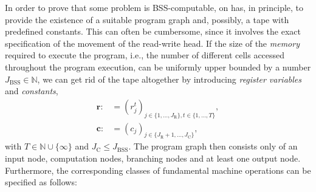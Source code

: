 \documentclass[conference]{IEEEtran}
\def\NN{{\mathbb N}}
\newcommand{\BSS}{\mathrm{BSS}}
\begin{document}
	In order to prove that some problem is BSS-computable, on has, in principle, to provide the existence of a suitable program graph and, possibly, a tape with predefined constants. 
	This can often be cumbersome, since it involves the exact specification of the movement of the read-write head. If the size of the \emph{memory} required to execute the program, i.e., 
	the number of different cells accessed throughout the program execution, can be uniformly upper bounded by a number \(J_\BSS \in \NN\), we can get rid of the tape altogether by 
	introducing \emph{register variables} and \emph{constants},
	\begin{align*}	\bm{r} :&= (r_j^t)_{j\in\{1,\ldots,J_{\mathrm{R}}\}, t\in\{1,\ldots,T\}},\\
					\bm{c} :&= (c_j)_{j\in\{J_{\mathrm{R}} + 1,\ldots,J_{\mathrm{C}}\}},
	\end{align*}
	with \(T\in\NN\cup\{\infty\}\) and \(J_{\mathrm{C}} \leq J_\BSS\). The program graph then consists only of an input node, computation nodes, branching nodes and at least one output node.
	Furthermore, the corresponding classes of fundamental machine operations can be specified as follows:
\end{document}
